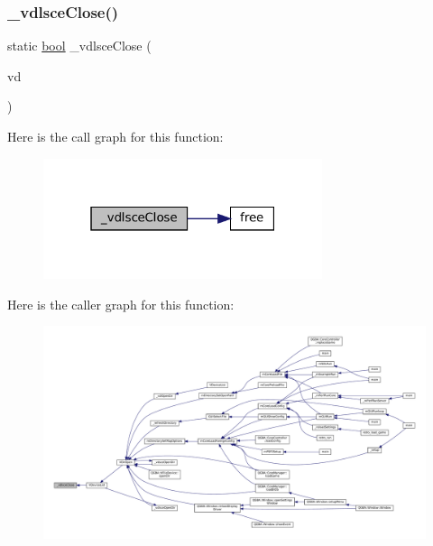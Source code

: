 \subsubsection{\texorpdfstring{\+\_\+vdlsce\+Close()}{\_vdlsceClose()}}
{\footnotesize\ttfamily static \mbox{\hyperlink{libretro_8h_a4a26dcae73fb7e1528214a068aca317e}{bool}} \+\_\+vdlsce\+Close (\begin{DoxyParamCaption}\item[{struct V\+Dir $\ast$}]{vd }\end{DoxyParamCaption})\hspace{0.3cm}{\ttfamily [static]}}

Here is the call graph for this function\+:
\nopagebreak
\begin{figure}[H]
\begin{center}
\leavevmode
\includegraphics[width=232pt]{sce-vfs_8c_ab25e52aef2dda5c0b7a37e497275d1aa_cgraph}
\end{center}
\end{figure}
Here is the caller graph for this function\+:
\nopagebreak
\begin{figure}[H]
\begin{center}
\leavevmode
\includegraphics[width=350pt]{sce-vfs_8c_ab25e52aef2dda5c0b7a37e497275d1aa_icgraph}
\end{center}
\end{figure}
\mbox{\label{sce-vfs_8c_aa4ebf2aba1bb6870bb1307f013c96403}} 
